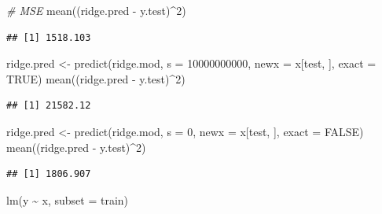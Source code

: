 \documentclass[
  12pt,
]{book}
\newenvironment{Shaded}{\begin{snugshade}}{\end{snugshade}}
\newcommand{\AttributeTok}[1]{\textcolor[rgb]{0.77,0.63,0.00}{#1}}
\newcommand{\CommentTok}[1]{\textcolor[rgb]{0.56,0.35,0.01}{\textit{#1}}}
\newcommand{\ConstantTok}[1]{\textcolor[rgb]{0.00,0.00,0.00}{#1}}
\newcommand{\DecValTok}[1]{\textcolor[rgb]{0.00,0.00,0.81}{#1}}
\newcommand{\FunctionTok}[1]{\textcolor[rgb]{0.00,0.00,0.00}{#1}}
\newcommand{\NormalTok}[1]{#1}
\newcommand{\OtherTok}[1]{\textcolor[rgb]{0.56,0.35,0.01}{#1}}
\newcommand{\SpecialCharTok}[1]{\textcolor[rgb]{0.00,0.00,0.00}{#1}}
\begin{document}
\begin{Shaded}
\begin{Highlighting}[]
\CommentTok{\# MSE}
\FunctionTok{mean}\NormalTok{((ridge.pred }\SpecialCharTok{{-}}\NormalTok{ y.test)}\SpecialCharTok{\^{}}\DecValTok{2}\NormalTok{)}
\end{Highlighting}
\end{Shaded}

\begin{verbatim}
## [1] 1518.103
\end{verbatim}

\begin{Shaded}
\begin{Highlighting}[]
\NormalTok{ridge.pred }\OtherTok{\textless{}{-}} \FunctionTok{predict}\NormalTok{(ridge.mod, }\AttributeTok{s =} \DecValTok{10000000000}\NormalTok{, }\AttributeTok{newx =}\NormalTok{ x[test,}
\NormalTok{    ], }\AttributeTok{exact =} \ConstantTok{TRUE}\NormalTok{)}
\FunctionTok{mean}\NormalTok{((ridge.pred }\SpecialCharTok{{-}}\NormalTok{ y.test)}\SpecialCharTok{\^{}}\DecValTok{2}\NormalTok{)}
\end{Highlighting}
\end{Shaded}

\begin{verbatim}
## [1] 21582.12
\end{verbatim}

\begin{Shaded}
\begin{Highlighting}[]
\NormalTok{ridge.pred }\OtherTok{\textless{}{-}} \FunctionTok{predict}\NormalTok{(ridge.mod, }\AttributeTok{s =} \DecValTok{0}\NormalTok{, }\AttributeTok{newx =}\NormalTok{ x[test,}
\NormalTok{    ], }\AttributeTok{exact =} \ConstantTok{FALSE}\NormalTok{)}
\FunctionTok{mean}\NormalTok{((ridge.pred }\SpecialCharTok{{-}}\NormalTok{ y.test)}\SpecialCharTok{\^{}}\DecValTok{2}\NormalTok{)}
\end{Highlighting}
\end{Shaded}

\begin{verbatim}
## [1] 1806.907
\end{verbatim}

\begin{Shaded}
\begin{Highlighting}[]
\FunctionTok{lm}\NormalTok{(y }\SpecialCharTok{\textasciitilde{}}\NormalTok{ x, }\AttributeTok{subset =}\NormalTok{ train)}
\end{Highlighting}
\end{Shaded}
\end{document}
